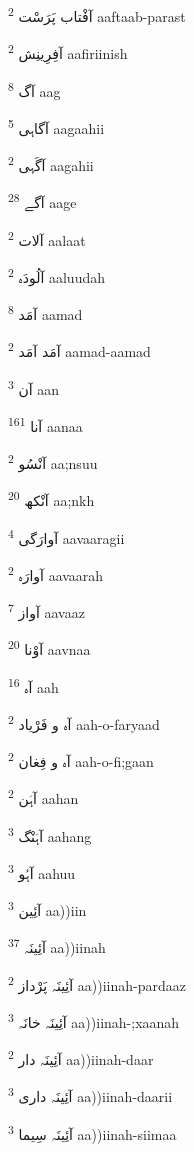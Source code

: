 \documentclass[12pt]{article}
\begin{document}
\begin{RTL}
\begin{multicols}{5}
{\ur آفْتاب پَرَسْت}   \textsuperscript{2} aaftaab-parast

{\ur آفِرِینِش}   \textsuperscript{2} aafiriinish

{\ur آگ}   \textsuperscript{8} aag

{\ur آگاہی}   \textsuperscript{5} aagaahii

{\ur آگَہی}   \textsuperscript{2} aagahii

{\ur آگے}   \textsuperscript{28} aage

{\ur آلات}   \textsuperscript{2} aalaat

{\ur آلُودَہ}   \textsuperscript{2} aaluudah

{\ur آمَد}   \textsuperscript{8} aamad

{\ur آمَد آمَد}   \textsuperscript{2} aamad-aamad

{\ur آن}   \textsuperscript{3} aan

{\ur آنا}   \textsuperscript{161} aanaa

{\ur آنْسُو}   \textsuperscript{2} aa;nsuu

{\ur آنْکھ}   \textsuperscript{20} aa;nkh

{\ur آوارَگی}   \textsuperscript{4} aavaaragii

{\ur آوارَہ}   \textsuperscript{2} aavaarah

{\ur آواز}   \textsuperscript{7} aavaaz

{\ur آوْنا}   \textsuperscript{20} aavnaa

{\ur آہ}   \textsuperscript{16} aah

{\ur آہ و فَرْیاد}   \textsuperscript{2} aah-o-faryaad

{\ur آہ و فِغان}   \textsuperscript{2} aah-o-fi;gaan

{\ur آہَن}   \textsuperscript{2} aahan

{\ur آہَنْگ}   \textsuperscript{3} aahang

{\ur آہُو}   \textsuperscript{3} aahuu

{\ur آئِین}   \textsuperscript{3} aa))iin

{\ur آئِینَہ}   \textsuperscript{37} aa))iinah

{\ur آئِینَہ پَرْداز}   \textsuperscript{2} aa))iinah-pardaaz

{\ur آئِینَہ خانَہ}   \textsuperscript{3} aa))iinah-;xaanah

{\ur آئِینَہ دار}   \textsuperscript{2} aa))iinah-daar

{\ur آئِینَہ داری}   \textsuperscript{3} aa))iinah-daarii

{\ur آئِینَہ سِیما}   \textsuperscript{3} aa))iinah-siimaa


\end{multicols}
\end{RTL}
\end{document}
